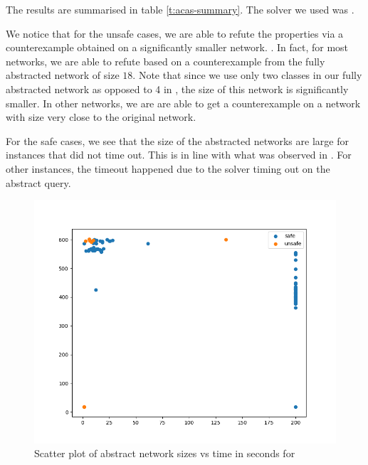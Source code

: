 The results are summarised in table \ref{t:acas-summary}. The solver we used was
\abcrown.  

We notice that for the unsafe cases, we are able to refute the
properties via a counterexample obtained on a significantly smaller network.
. In fact, for most
networks, we are able to refute based on a counterexample from the fully
abstracted network of size $18$.  Note that since we use only two classes in our
fully abstracted network as opposed to 4 in \cite{cegar-nn}, the size of this
network is significantly smaller. In other networks, we are are able to get a
counterexample on a network with size very close to the original network.

For the safe cases, we see that the size of the abstracted networks are large
for instances that did not time out.  This is in line with what was observed in
\cite{cegar-nn} . For other instances, the timeout happened
due to the solver timing out on the abstract query. 

\begin{figure}
    \includegraphics[scale=0.4]{figs/acas-scatter.png}
   \caption{Scatter plot of abstract network sizes vs time in seconds for
   \acasxu}
   \label{f:acas-scatter}
\end{figure}

